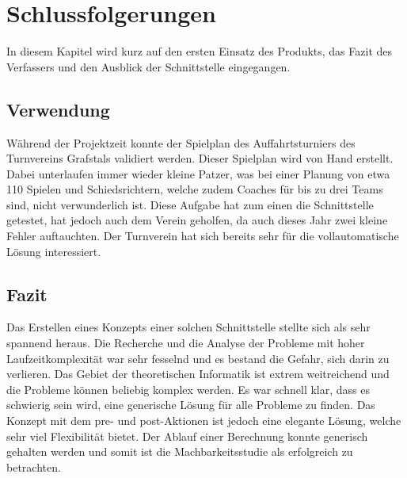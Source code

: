 %
%


\chapter{Schlussfolgerungen}\label{chap.Schlussfolgerungen}
In diesem Kapitel wird kurz auf den ersten Einsatz des Produkts, das Fazit des Verfassers und den Ausblick der Schnittstelle eingegangen.

\section{Verwendung}\label{fazit_verwendung}
Während der Projektzeit konnte der Spielplan des Auffahrtsturniers des Turnvereins Grafstals validiert werden. Dieser Spielplan wird von Hand erstellt. Dabei unterlaufen immer wieder 
kleine Patzer, was bei einer Planung von etwa 110 Spielen und Schiedsrichtern, welche zudem Coaches für bis zu drei Teams sind, nicht verwunderlich ist. Diese Aufgabe hat zum einen die Schnittstelle 
getestet, hat jedoch auch dem Verein geholfen, da auch dieses Jahr zwei kleine Fehler auftauchten. Der Turnverein hat sich bereits sehr für die vollautomatische Lösung interessiert.

\section{Fazit}\label{fazit}

Das Erstellen eines Konzepts einer solchen Schnittstelle stellte sich als sehr spannend heraus. Die Recherche und die Analyse der Probleme mit hoher Laufzeitkomplexität war sehr fesselnd und es 
bestand die Gefahr, sich darin zu verlieren. Das Gebiet der theoretischen Informatik ist extrem weitreichend und die Probleme können beliebig komplex werden. Es war schnell klar, dass es schwierig 
sein wird, eine generische Lösung für alle Probleme zu finden. Das Konzept mit dem pre- und post-Aktionen ist jedoch eine elegante Lösung, welche sehr viel Flexibilität bietet. Der Ablauf einer Berechnung 
konnte generisch gehalten werden und somit ist die Machbarkeitsstudie als erfolgreich zu betrachten.

